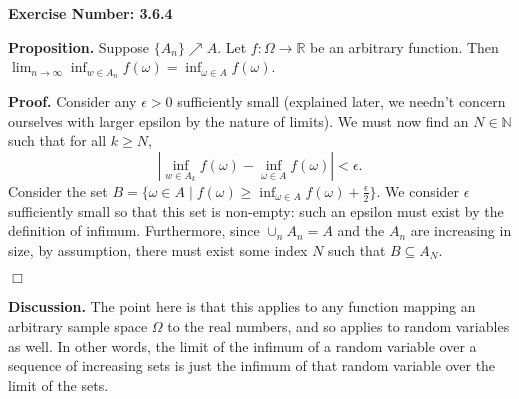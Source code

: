 \documentclass{article}
\begin{document}
\noindent \textbf{Exercise Number: 3.6.4}  %

\bigskip

\noindent \textbf{Proposition.} Suppose $\{A_n\} \nearrow A$. Let $f \colon \Omega \to \mathbb{R}
$ be an arbitrary function. Then $\lim_{n \to \infty} \inf_{w \in A_n} f(\omega) = \inf_{\omega \in A} f(\omega)$.

\medskip

\noindent \textbf{Proof.} Consider any $\epsilon > 0$ sufficiently small (explained later, we needn't concern ourselves with larger epsilon by the nature of limits). We must now find an $N \in \mathbb{N}$ such that for all $k \geq N$, \[|\inf_{w \in A_k} f(\omega) - \inf_{\omega \in A} f(\omega)| < \epsilon.\] Consider the set $B = \{\omega \in A \mid f(\omega) \geq \inf_{\omega \in A} f(\omega) + \frac{\epsilon}{2}\}$. We consider $\epsilon$ sufficiently small so that this set is non-empty: such an epsilon must exist by the definition of infimum. Furthermore, since $\cup_n A_n = A$ and the $A_n$ are increasing in size, by assumption, there must exist some index $N$ such that $B \subseteq A_N$. 

\hfill $\Box$

\bigskip

\noindent \textbf{Discussion.} The point here is that this applies to any function mapping an arbitrary sample space $\Omega$ to the real numbers, and so applies to random variables as well. In other words, the limit of the infimum of a random variable over a sequence of increasing sets is just the infimum of that random variable over the limit of the sets. 
\end{document}
